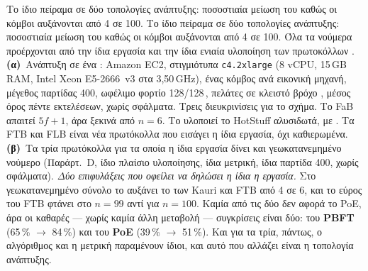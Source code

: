 %
{Το ίδιο πείραμα σε δύο τοπολογίες ανάπτυξης: ποσοστιαία μείωση του
\protect{} καθώς οι κόμβοι αυξάνονται από 4 σε 100.}%
{Το ίδιο πείραμα σε δύο τοπολογίες ανάπτυξης: ποσοστιαία μείωση του
\protect{} καθώς οι κόμβοι αυξάνονται από 4 σε 100. Όλα τα
νούμερα προέρχονται από την ίδια εργασία και την ίδια ενιαία υλοποίηση
των πρωτοκόλλων \cite{amiri2024bedrock}. \textbf{(α)}~Ανάπτυξη σε ένα
: Amazon EC2, στιγμιότυπα \texttt{c4.2xlarge} (8 vCPU,
15\,GB RAM, Intel Xeon E5-2666~v3 στα 3{,}50\,GHz), ένας κόμβος ανά
εικονική μηχανή, μέγεθος παρτίδας 400, ωφέλιμο φορτίο 128/128\,,
πελάτες σε κλειστό βρόχο \cite{schroeder2006openclosed}\unver, μέσος όρος πέντε
εκτελέσεων, χωρίς σφάλματα. Τρεις διευκρινίσεις για το σχήμα. Το FaB
απαιτεί $5f{+}1$, άρα ξεκινά από $n=6$. Το \cite{amiri2024bedrock}
υλοποιεί το HotStuff αλυσιδωτά, με . Τα FTB και FLB είναι
νέα πρωτόκολλα που εισάγει η ίδια εργασία, όχι καθιερωμένα.
\textbf{(β)}~Τα τρία πρωτόκολλα για τα οποία η ίδια εργασία δίνει και
γεωκατανεμημένο νούμερο (Παράρτ.~D, ίδιο πλαίσιο υλοποίησης, ίδια
μετρική, ίδια παρτίδα 400, χωρίς σφάλματα). \emph{Δύο επιφυλάξεις που
οφείλει να δηλώσει η ίδια η εργασία.} Στο γεωκατανεμημένο σύνολο το
\cite{amiri2024bedrock} αυξάνει το  των Kauri και
FTB από 4 σε 6, και το εύρος του FTB φτάνει στο $n=99$ αντί για $n=100$.
Καμία από τις δύο δεν αφορά το PoE, άρα οι καθαρές --- χωρίς καμία άλλη
μεταβολή --- συγκρίσεις είναι δύο: του \textbf{PBFT} (65\,\% $\to$
84\,\%) και του \textbf{PoE} (39\,\% $\to$ 51\,\%). Και για τα τρία,
πάντως, ο αλγόριθμος και η μετρική παραμένουν ίδιοι, και αυτό που αλλάζει
είναι η τοπολογία ανάπτυξης.}%
{}

